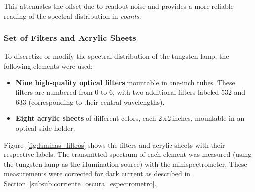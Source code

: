 This attenuates the offset due to readout noise and provides a more reliable reading of the spectral distribution in \emph{counts}.

\subsubsection{Set of Filters and Acrylic Sheets}
\label{subsub:filtros_laminas}

To discretize or modify the spectral distribution of the tungsten lamp, the following elements were used:

\begin{itemize}
    \item \textbf{Nine high-quality optical filters} mountable in one-inch tubes. These filters are numbered from 0 to 6, with two additional filters labeled 532 and 633 (corresponding to their central wavelengths).
    
    \item \textbf{Eight acrylic sheets} of different colors, each 2\,x\,2\,inches, mountable in an optical slide holder.
\end{itemize}

Figure~\ref{fig:laminas_filtros} shows the filters and acrylic sheets with their respective labels. The transmitted spectrum of each element was measured (using the tungsten lamp as the illumination source) with the minispectrometer. These measurements were corrected for dark current as described in Section~\ref{subsub:corriente_oscura_espectrometro}.

